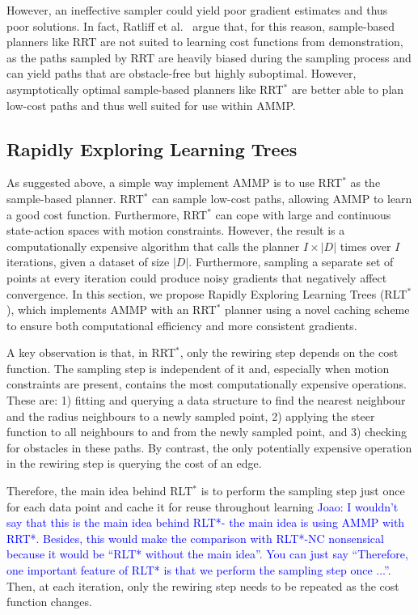 \documentclass[letterpaper, 10 pt, conference]{ieeeconf}
\newcommand{\jm}[1]{\textcolor{blue}{Joao: #1}}
\begin{document}
However, an ineffective sampler could yield poor gradient estimates and thus poor solutions. In fact, Ratliff et al.\ \cite{ratliff2009chomp} argue that, for this reason, sample-based planners like RRT are not suited to learning cost functions from demonstration, as the paths sampled by RRT are heavily biased during the sampling process and can yield paths that are obstacle-free but highly suboptimal. However, asymptotically optimal sample-based planners like RRT$^*$ are better able to plan low-cost paths \cite{karaman2011sampling} and thus well suited for use within AMMP.

\subsection{Rapidly Exploring Learning Trees \label{subsec:cached}}

As suggested above, a simple way implement AMMP is to use RRT$^*$ as the sample-based planner.  RRT$^*$ can sample low-cost paths, allowing AMMP to learn a good cost function. Furthermore, RRT$^*$ can cope with large and continuous state-action spaces with motion constraints. However, the result is a computationally expensive algorithm that calls the planner $I\times|D|$ times over $I$ iterations, given a dataset of size $|D|$. Furthermore, sampling a separate set of points at every iteration could produce noisy gradients that negatively affect convergence. In this section, we propose Rapidly Exploring Learning Trees (RLT$^*$), which implements AMMP with an RRT$^*$ planner using a novel caching scheme to ensure both computational efficiency and more consistent gradients.

A key observation is that, in RRT$^*$, only the rewiring step depends on the cost function.  The sampling step is independent of it and, especially when motion constraints are present, contains the most computationally expensive operations. These are: 1) fitting and querying a data structure to find the nearest neighbour and the radius neighbours to a newly sampled point, 2) applying the steer function to all neighbours to and from the newly sampled point, and 3) checking for obstacles in these paths. By contrast,  the only potentially expensive operation in the rewiring step is querying the cost of an edge. 

Therefore, the main idea behind RLT$^*$ is to perform the sampling step just once for each data point and cache it for reuse throughout learning \jm{I wouldn't say that this is the main idea behind RLT*- the main idea is using AMMP with RRT*. Besides, this would make the comparison with RLT*-NC nonsensical because it would be ``RLT* without the main idea''. You can just say ``Therefore, one important feature of RLT* is that we perform the sampling step once ...''}.  Then, at each iteration, only the rewiring step needs to be repeated as the cost function changes.
\end{document}
